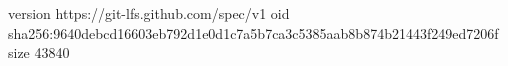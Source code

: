 version https://git-lfs.github.com/spec/v1
oid sha256:9640debcd16603eb792d1e0d1c7a5b7ca3c5385aab8b874b21443f249ed7206f
size 43840
